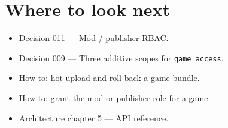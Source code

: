 \documentclass[11pt,a4paper,openany]{book}
\begin{document}
\chapter{Where to look next}
\begin{itemize}
  \item Decision 011 --- Mod / publisher RBAC.
  \item Decision 009 --- Three additive scopes for \texttt{game\_access}.
  \item How-to: hot-upload and roll back a game bundle.
  \item How-to: grant the mod or publisher role for a game.
  \item Architecture chapter 5 --- API reference.
\end{itemize}
\end{document}
